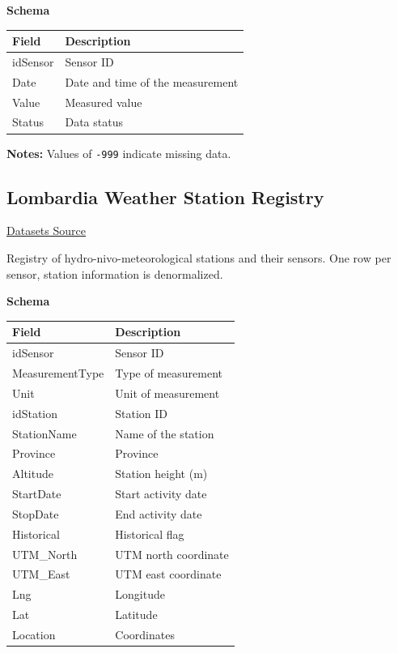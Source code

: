 \documentclass{article}
\begin{document}
	\textbf{Schema}
	
	\begin{table}[H]
		\centering
		\begin{tabular}{ll}
			\hline
			Field & Description \\
			\hline
			idSensor & Sensor ID \\
			Date & Date and time of the measurement \\
			Value & Measured value \\
			Status & Data status \\
			\hline
		\end{tabular}
	\end{table}
	
	\textbf{Notes:} Values of \texttt{-999} indicate missing data.
	
	\subsection{Lombardia Weather Station Registry}
	
	\href{https://www.dati.Lombardia.it/Ambiente/Stazioni-Idro-Nivo-Meteorologiche/nf78-nj6b/about_data}{Datasets Source}
	
	Registry of hydro-nivo-meteorological stations and their sensors. One row per sensor, station information is denormalized.
	
	\textbf{Schema}
		
	\begin{table}[H]
		\centering
		\begin{tabular}{ll}
			\hline
			Field & Description \\
			\hline
			idSensor & Sensor ID \\
			MeasurementType & Type of measurement \\
			Unit & Unit of measurement \\
			idStation & Station ID \\
			StationName & Name of the station \\
			Province & Province \\
			Altitude & Station height (m) \\
			StartDate & Start activity date \\
			StopDate & End activity date \\
			Historical & Historical flag \\
			UTM\_North & UTM north coordinate \\
			UTM\_East & UTM east coordinate \\
			Lng & Longitude \\
			Lat & Latitude \\
			Location & Coordinates \\
			\hline
		\end{tabular}
	\end{table}
	
\end{document}

